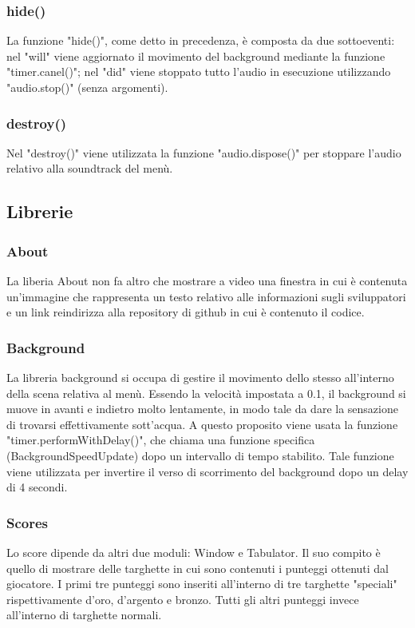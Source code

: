 \documentclass[12pt]{article}
\begin{document}
\subsubsection{hide()}
La funzione "hide()", come detto in precedenza, è composta da due sottoeventi:  nel "will" viene aggiornato il movimento del background mediante la funzione "timer.canel()"; nel "did" viene stoppato tutto l'audio in esecuzione utilizzando "audio.stop()" (senza argomenti).

\subsubsection{destroy()}
Nel "destroy()" viene utilizzata la funzione "audio.dispose()" per stoppare l'audio relativo alla soundtrack del menù. 

\subsection{Librerie}
\subsubsection{About}
La liberia About non fa altro che mostrare a video una finestra in cui è contenuta un'immagine che rappresenta un testo relativo alle informazioni sugli sviluppatori e un link reindirizza alla repository di github in cui è contenuto il codice. 

\subsubsection{Background}
La libreria background si occupa di gestire il movimento dello stesso all'interno della scena relativa al menù. Essendo la velocità impostata a 0.1, il background si muove in avanti e indietro molto lentamente, in modo tale da dare la sensazione di trovarsi effettivamente sott'acqua. A questo proposito viene usata la funzione "timer.performWithDelay()", che chiama una funzione specifica (BackgroundSpeedUpdate) dopo un intervallo di tempo stabilito. Tale funzione viene utilizzata per invertire il verso di scorrimento del background dopo un delay di 4 secondi. 
\subsubsection{Scores}
Lo score dipende da altri due moduli: Window e Tabulator. Il suo compito è quello di mostrare delle targhette in cui sono contenuti i punteggi ottenuti dal giocatore. I primi tre punteggi sono inseriti all'interno di tre targhette "speciali" rispettivamente d'oro, d'argento e bronzo. Tutti gli altri punteggi invece all'interno di targhette normali. 
\end{document}
